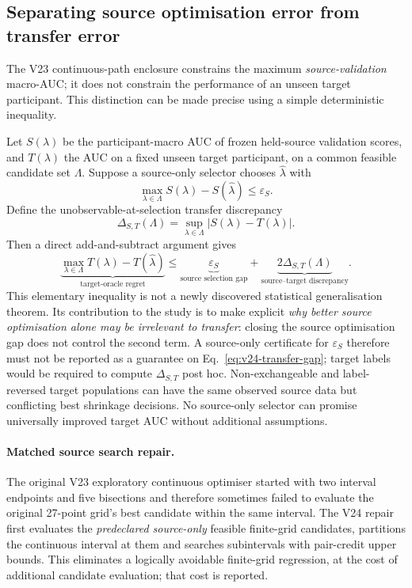 \subsection{Separating source optimisation error from transfer error}
\label{sec:v24-selection-gap}
The V23 continuous-path enclosure constrains the maximum
\emph{source-validation} macro-AUC; it does not constrain the
performance of an unseen target participant. This distinction can
be made precise using a simple deterministic inequality.

Let $S(\lambda)$ be the participant-macro AUC of frozen
held-source validation scores, and $T(\lambda)$ the AUC on
a fixed unseen target participant, on a common feasible candidate
set $\Lambda$. Suppose a source-only selector chooses
$\widehat\lambda$ with
\[
 \max_{\lambda\in\Lambda} S(\lambda)
   -S(\widehat\lambda)\le\varepsilon_S.
\]
Define the unobservable-at-selection transfer discrepancy
\[
 \Delta_{S,T}(\Lambda)=
 \sup_{\lambda\in\Lambda}|S(\lambda)-T(\lambda)|.
\]
Then a direct add-and-subtract argument gives
\begin{equation}
 \underbrace{\max_{\lambda\in\Lambda}T(\lambda)
   -T(\widehat\lambda)}_{\text{target-oracle regret}}
 \le \underbrace{\varepsilon_S}_{\text{source selection gap}}
 +\underbrace{2\Delta_{S,T}(\Lambda)}_{\text{source--target discrepancy}}.
 \label{eq:v24-transfer-gap}
\end{equation}
This elementary inequality is not a newly discovered statistical
generalisation theorem. Its contribution to the study is to make
explicit \emph{why better source optimisation alone may be
irrelevant to transfer}: closing the source optimisation gap does
not control the second term. A source-only certificate for
$\varepsilon_S$ therefore must not be reported as a guarantee
on Eq.~\eqref{eq:v24-transfer-gap}; target labels would be required
to compute $\Delta_{S,T}$ post hoc. Non-exchangeable and label-reversed
target populations can have the same observed source data but
conflicting best shrinkage decisions. No source-only selector can
promise universally improved target AUC without additional
assumptions.

\paragraph{Matched source search repair.}
The original V23 exploratory continuous optimiser started with two
interval endpoints and five bisections and therefore sometimes
failed to evaluate the original 27-point grid's best candidate
within the same interval. The V24 repair first evaluates the
\emph{predeclared source-only} feasible finite-grid candidates,
partitions the continuous interval at them and searches
subintervals with pair-credit upper bounds. This eliminates
a logically avoidable finite-grid regression, at the cost of
additional candidate evaluation; that cost is reported.

